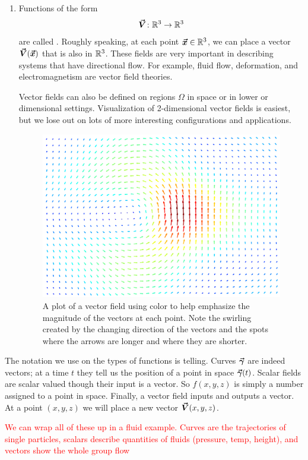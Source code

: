 \begin{enumerate}[(1)]
        \item Functions of the form
        \[
        \boldsymbol{\vec{V}} \colon \mathbb{R}^3 \to \mathbb{R}^3
        \]
        are called .  Roughly speaking, at each point $\boldsymbol{\vec{x}} \in \mathbb{R}^3$, we can place a vector $\boldsymbol{\vec{V}}(\boldsymbol{\vec{x}})$ that is also in $\mathbb{R}^3$.  These fields are very important in describing systems that have directional flow.  For example, fluid flow, deformation, and electromagnetism are vector field theories. 

        Vector fields can also be defined on regions $\Omega$ in space or in lower or dimensional settings. Visualization of 2-dimensional vector fields is easiest, but we lose out on lots of more interesting configurations and applications. 

        \begin{figure}[H]
            \centering
            \includegraphics[width=.8\textwidth]{Figures_Part_5/vector_field.png}
            \caption{A plot of a vector field using color to help emphasize the magnitude of the vectors at each point. Note the swirling created by the changing direction of the vectors and the spots where the arrows are longer and where they are shorter.}
        \end{figure}
        \end{enumerate}
        
        The notation we use on the types of functions is telling. Curves $\boldsymbol{\vec{\gamma}}$ are indeed vectors; at a time $t$ they tell us the position of a point in space $\boldsymbol{\vec{\gamma}}(t)$. Scalar fields are scalar valued though their input is a vector. So $f(x,y,z)$ is simply a number assigned to a point in space. Finally, a vector field inputs and outputs a vector. At a point $(x,y,z)$ we will place a new vector $\boldsymbol{\vec{V}}(x,y,z)$.

        \textcolor{red}{We can wrap all of these up in a fluid example. Curves are the trajectories of single particles, scalars describe quantities of fluids (pressure, temp, height), and vectors show the whole group flow}

